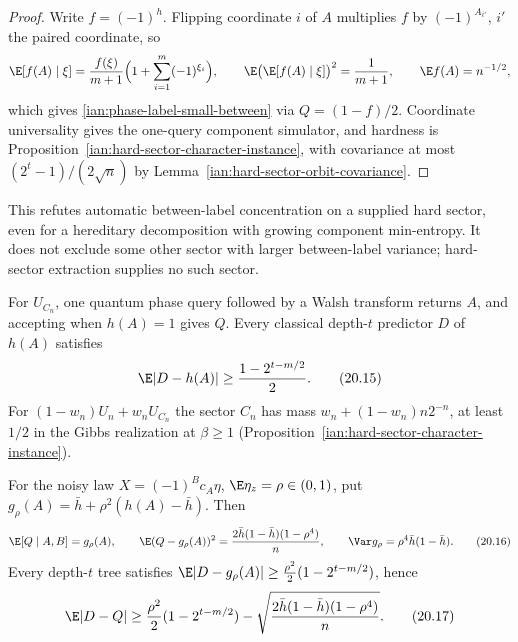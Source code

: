 \begin{proof}
Write \(f=(-1)^h\). Flipping coordinate \(i\) of \(A\) multiplies \(f\)
by \((-1)^{A_{i'}}\), \(i'\) the paired coordinate, so
\[
 \E[f(A)\mid\xi]
 =\frac{f(\xi)}{m+1}\Bigl(1+\sum_{i=1}^m(-1)^{\xi_i}\Bigr),
 \qquad
 \E\bigl(\E[f(A)\mid\xi]\bigr)^2=\frac1{m+1},
 \qquad
 \E f(A)=n^{-1/2},
\]
which gives \eqref{ian:phase-label-small-between} via \(Q=(1-f)/2\).
Coordinate universality gives the one-query component simulator, and
hardness is Proposition~\ref{ian:hard-sector-character-instance}, with
covariance at most \((2^t-1)/(2\sqrt n)\) by
Lemma~\ref{ian:hard-sector-orbit-covariance}.
\end{proof}

This refutes automatic between-label concentration on a supplied hard
sector, even for a hereditary decomposition with growing component
min-entropy. It does not exclude some other sector with larger
between-label variance; hard-sector extraction supplies no such sector.

\begin{proposition}
\label{ian:phase-label-character-noisy-instances}
For \(U_{C_n}\), one quantum phase query followed by a Walsh transform
returns \(A\), and accepting when \(h(A)=1\) gives \(Q\). Every classical
depth-\(t\) predictor \(D\) of \(h(A)\) satisfies
\[
 \E|D-h(A)|\ge\frac{1-2^{t-m/2}}2.
 \tag{20.15}\label{ian:phase-label-clean-bound}
\]
For \((1-w_n)U_n+w_nU_{C_n}\) the sector \(C_n\) has mass
\(w_n+(1-w_n)n2^{-n}\), at least \(1/2\) in the Gibbs realization at
\(\beta\ge1\) (Proposition~\ref{ian:hard-sector-character-instance}).

For the noisy law \(X=(-1)^Bc_A\eta\), \(\E\eta_z=\rho\in(0,1)\), put
\(g_\rho(A)=\bar h+\rho^2(h(A)-\bar h)\). Then
\[
 \E[Q\mid A,B]=g_\rho(A),\qquad
 \E(Q-g_\rho(A))^2=\frac{2\bar h(1-\bar h)(1-\rho^4)}n,\qquad
 \Var g_\rho=\rho^4\bar h(1-\bar h).
 \tag{20.16}\label{ian:phase-label-noisy-flatness}
\]
Every depth-\(t\) tree satisfies
\(\E|D-g_\rho(A)|\ge\frac{\rho^2}{2}(1-2^{t-m/2})\), hence
\[
 \E|D-Q|
 \ge\frac{\rho^2}{2}(1-2^{t-m/2})
 -\sqrt{\frac{2\bar h(1-\bar h)(1-\rho^4)}n}.
 \tag{20.17}\label{ian:phase-label-noisy-bound}
\]
\end{proposition}

